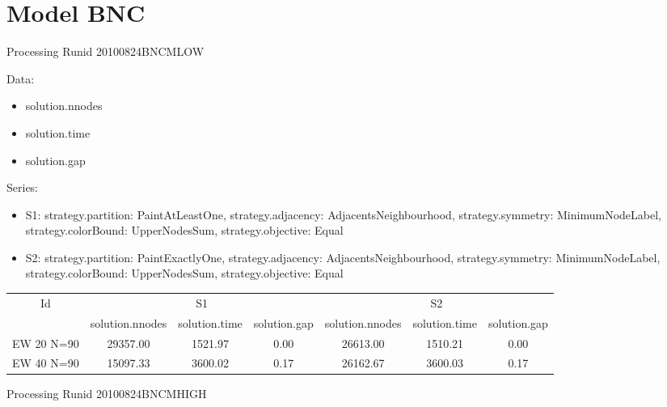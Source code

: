 \documentclass[landscape, 12pt]{report}
\begin{document}
	
	\section{Model BNC}
	
	Processing Runid 20100824BNCMLOW

Data:
\begin{itemize}
\item solution.nnodes
\item solution.time
\item solution.gap
\end{itemize}
Series:
\begin{itemize}
\item S1: strategy.partition: PaintAtLeastOne, strategy.adjacency: AdjacentsNeighbourhood, strategy.symmetry: MinimumNodeLabel, strategy.colorBound: UpperNodesSum, strategy.objective: Equal
\item S2: strategy.partition: PaintExactlyOne, strategy.adjacency: AdjacentsNeighbourhood, strategy.symmetry: MinimumNodeLabel, strategy.colorBound: UpperNodesSum, strategy.objective: Equal
\end{itemize}
\begin{tabular}{|c|ccc|ccc|}
\hline
\multicolumn{1}{|c|}{Id} & \multicolumn{3}{|c|}{S1} & \multicolumn{3}{|c|}{S2}
\\
 & solution.nnodes & solution.time & solution.gap & solution.nnodes & solution.time & solution.gap
\\
\hline
EW 20 N=90 & 29357.00 & 1521.97 & 0.00 & 26613.00 & 1510.21 & 0.00
\\
EW 40 N=90 & 15097.33 & 3600.02 & 0.17 & 26162.67 & 3600.03 & 0.17
\\
\hline 
 \end{tabular}

Processing Runid 20100824BNCMHIGH
\end{document}
